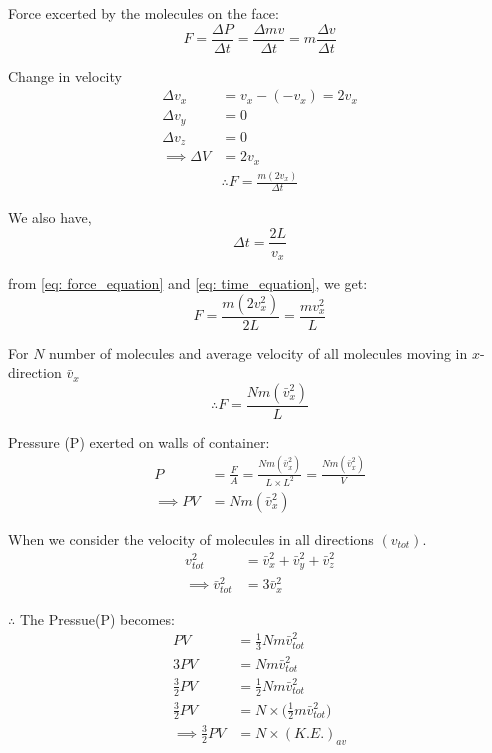 \documentclass[fleqn,10pt]{SelfArx} %
\begin{document}
Force excerted by the molecules  on the face:
\begin{equation}
   F = \frac{\Delta P}{\Delta t} = \frac{\Delta mv}{\Delta t} = m\frac{\Delta v}{\Delta t}
    \label{eq:force exerted}
\end{equation}

Change in velocity 
\begin{align}
   \Delta v_x &= v_x - (-v_x) = 2v_x \\
   \Delta v_y &= 0 \\
   \Delta v_z &= 0 \\
   \implies \Delta V &= 2v_x
   \label{eq:velocity of particle}
\end{align}
\begin{align}
    \therefore F = \frac{m (2v_x)}{\Delta t}     \label{eq: force_equation}
\end{align}

We also have,
\begin{equation}
    \Delta t = \frac{2L}{v_x}
    \label{eq: time_equation}
\end{equation}

from \cref{eq: force_equation} and \cref{eq: time_equation}, we get:
\begin{equation}
    F = \frac{m (2v_x^2)}{2L} = \frac{m v_x^2}{L}
\end{equation}

For $N$ number of molecules and average velocity of all molecules moving in $x$-direction $\bar{v}_x$
\begin{equation}
    \therefore F = \frac{Nm (\bar{v}_x^2)}{L}
\end{equation}

Pressure (P) exerted on walls of container:
\begin{align}
    P &= \frac{F}{A} = \frac{Nm (\bar{v}_x^2)}{L \times L^2} = \frac{Nm (\bar{v}_x^2)}{V} \\
    \implies  PV &=  Nm (\bar{v}_x^2)
\end{align}

When we consider  the velocity of molecules in all directions $(v_{tot})$.
\begin{align}
    v_{tot}^2 &= \bar{v}_x^2 + \bar{v}_y^2 + \bar{v}_z^2 \\
    \implies \bar{v}_{tot}^2 &= 3\bar{v}_x^2
\end{align}

$\therefore$ The Pressue(P) becomes:
\begin{align}
    PV &= \frac{1}{3} Nm \bar{v}_{tot}^2 \\
    3PV &= Nm \bar{v}_{tot}^2 \\
    \frac{3}{2} PV &= \frac{1}{2} Nm \bar{v}_{tot}^2 \\
    \frac{3}{2} PV &= N \times \Big(\frac{1}{2}m\bar{v}_{tot}^2 \Big)\\ 
    \implies \frac{3}{2} PV &= N \times(K.E.)_{av}\\ 
\end{align}
\end{document}

